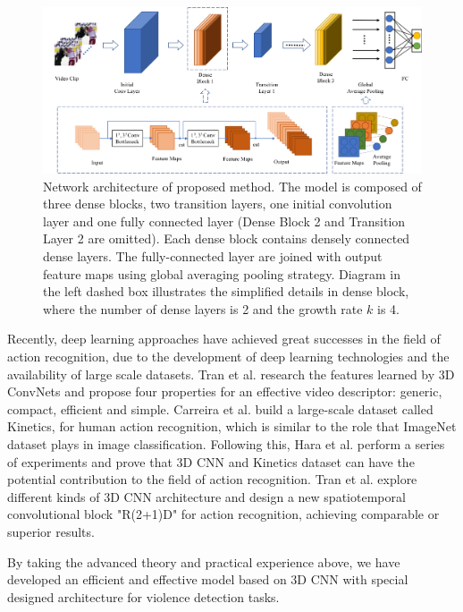 \documentclass[10pt,twocolumn,letterpaper]{article}
\begin{document}
\begin{figure}
\begin{center}
\includegraphics[scale=0.55]{fig/fig1.png}
\end{center}
\caption{Network architecture of proposed method. The model is composed of three dense blocks, two transition layers, one initial convolution layer and one fully connected layer (Dense Block 2 and Transition Layer 2 are omitted). Each dense block contains densely connected dense layers. The fully-connected layer are joined with output feature maps using global averaging pooling strategy. Diagram in the left dashed box illustrates the simplified details in dense block, where the number of dense layers is 2 and the growth rate $k$ is 4.}
\label{fig:model}
\end{figure}




Recently, deep learning approaches have achieved great successes in the field of action recognition, due to the development of deep learning technologies and the availability of large scale datasets. 
Tran et al. \cite{3dcnn_1} research the features learned by 3D ConvNets and propose four properties for an effective video descriptor: generic, compact, efficient and simple. 
Carreira et al. \cite{kinetics} build a large-scale dataset called Kinetics, for human action recognition, which is similar to the role that ImageNet \cite{imagenet} dataset plays in image classification. 
Following this, Hara et al. \cite{3dcnn_2} perform a series of experiments and prove that 3D CNN and Kinetics dataset can have the potential contribution to the field of action recognition.
Tran et al. \cite{r2+1d} explore different kinds of 3D CNN architecture and design a new spatiotemporal convolutional block "R(2+1)D" for action recognition, achieving comparable or superior results.

By taking the advanced theory and practical experience above, we have developed an efficient and effective model based on 3D CNN with special designed architecture for violence detection tasks.
\end{document}
